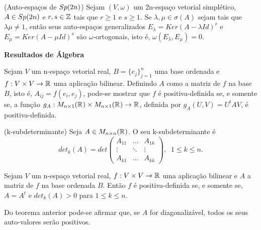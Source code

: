 \documentclass{beamer}
\newcommand{\titulo}[1]{\centering \textbf{#1}}
\begin{document}
\begin{frame}
	\begin{lema}
		(Auto-espaços de $Sp(2n)$) Sejam $(V, \omega)$ um 2n-espaço vetorial simplético, $A \in Sp(2n)$ e $r,s \in \mathbb{Z}$ tais que $r\geq 1$ e $s\geq 1$. Se $\lambda, \mu \in \sigma(A)$ sejam tais que $\lambda\mu \neq 1$, então seus auto-espaços generalizados $E_{\lambda}=Ker(A-\lambda Id)^{r}$ e  $E_{\mu}=Ker(A-\mu Id)^{s}$ são $\omega$-ortogonais, isto é, $\omega(E_{\lambda}, E_{\mu}) = 0$.
	\end{lema}
\end{frame}

\begin{frame}
	\titulo{Resultados de Álgebra}
		
	Sejam $V$ um n-espaço vetorial real, $B= \{e_{j}\}_{j=1}^{n}$ uma base ordenada e $f:V\times V\to \mathbb{R}^{}$ uma aplicação bilinear. Definindo $A$ como a matriz de $f$ na base $B$, isto é, $A_{ij} = f(e_{i}, e_{j})$, pode-se mostrar que $f$ é positiva-definida se, e somente se, a função $g_{A}: M_{n\times 1}(\mathbb{R}^{})\times M_{n\times 1}(\mathbb{R}^{}) \to \mathbb{R}^{}$, definida por $
		g_{A}(U,V) = U^{t}AV$, é positiva-definida.
	
	\begin{definicao}
		(k-subdeterminante) Seja $A \in M_{n \times n}(\mathbb{R}^{})$. O seu k-subdeterminante é
		$$
		det_{k}(A) =
		det \left(
		\begin{array}{ccc}
		A_{11} & \dots & A_{1k}
		\\
		\vdots & \ddots & \vdots
		\\
		A_{k1} & \dots & A_{kk}
		\end{array}
		\right),\;\; 1\leq k \leq n.
		$$
	\end{definicao}	
\end{frame}

\begin{frame}
	\begin{teorema}
		Sejam $V$ um n-espaço vetorial real, $f: V\times V\to \mathbb{R}^{}$ uma aplicação bilinear e $A$ a matriz de $f$ na base ordenada $B$. Então $f$ é positiva-definida se, e somente se, $A=A^{t}$ e $det_{k}(A)>0$ para $1\leq k\leq n$.
	\end{teorema}
	
	\begin{observacao}
		Do teorema anterior pode-se afirmar que, se $A$ for diagonalizável, todos os seus auto-valores serão positivos.
	\end{observacao}
\end{frame}
\end{document}

